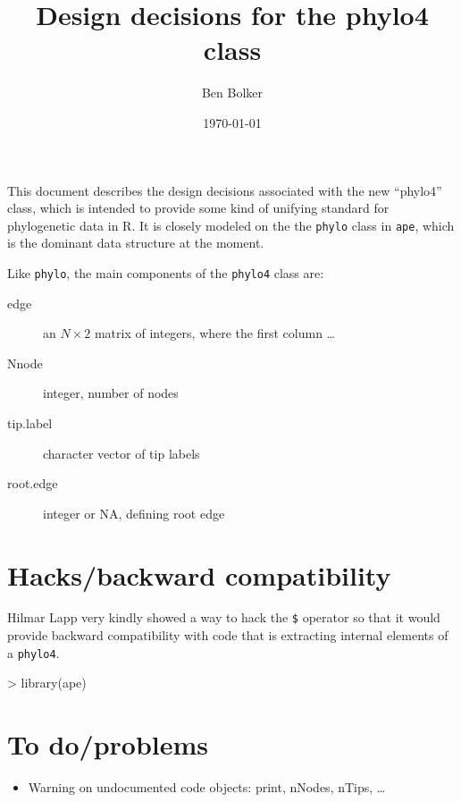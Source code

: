 \documentclass{article}
\title{Design decisions for the phylo4 class}
\author{Ben Bolker}
\date{\today}
\newcommand{\code}[1]{{{\tt #1}}}
\begin{document}
\maketitle

This document describes the design decisions associated
with the new ``phylo4'' class, which is intended to
provide some kind of unifying standard for phylogenetic
data in R.  It is closely modeled on the the \code{phylo}
class in \code{ape}, which is the dominant data structure
at the moment.

Like \code{phylo}, the main components of
the \code{phylo4} class are:
\begin{description}
\item[edge]{an $N \times 2$ matrix of integers,
  where the first column \ldots}
\item[Nnode]{integer, number of nodes}
\item[tip.label]{character vector of tip labels}
\item[root.edge]{integer or NA, defining root edge}
\end{description}
 
\section{Hacks/backward compatibility}

Hilmar Lapp very kindly showed a way to hack
the \verb+$+ operator so that it would provide
backward compatibility with code that is 
extracting internal elements of a \code{phylo4}.

\begin{Schunk}
\begin{Sinput}
> library(ape)
\end{Sinput}
\end{Schunk}
\section{To do/problems}


\begin{itemize}
\item Warning on undocumented code objects: print, nNodes, nTips, \ldots
\end{itemize}
\end{document}

